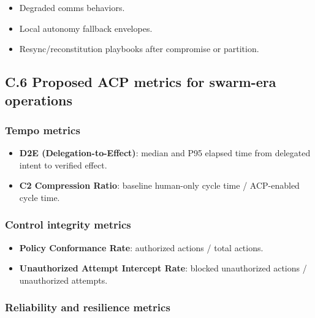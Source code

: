 \documentclass[
]{article}
\providecommand{\tightlist}{%
  \setlength{\itemsep}{0pt}\setlength{\parskip}{0pt}}
\begin{document}
\begin{itemize}
\tightlist
\item
  Degraded comms behaviors.
\item
  Local autonomy fallback envelopes.
\item
  Resync/reconstitution playbooks after compromise or partition.
\end{itemize}

\hypertarget{c.6-proposed-acp-metrics-for-swarm-era-operations}{%
\subsection{C.6 Proposed ACP metrics for swarm-era
operations}\label{c.6-proposed-acp-metrics-for-swarm-era-operations}}

\hypertarget{tempo-metrics}{%
\subsubsection{Tempo metrics}\label{tempo-metrics}}

\begin{itemize}
\tightlist
\item
  \textbf{D2E (Delegation-to-Effect)}: median and P95 elapsed time from
  delegated intent to verified effect.
\item
  \textbf{C2 Compression Ratio}: baseline human-only cycle time /
  ACP-enabled cycle time.
\end{itemize}

\hypertarget{control-integrity-metrics}{%
\subsubsection{Control integrity
metrics}\label{control-integrity-metrics}}

\begin{itemize}
\tightlist
\item
  \textbf{Policy Conformance Rate}: authorized actions / total actions.
\item
  \textbf{Unauthorized Attempt Intercept Rate}: blocked unauthorized
  actions / unauthorized attempts.
\end{itemize}

\hypertarget{reliability-and-resilience-metrics}{%
\subsubsection{Reliability and resilience
metrics}\label{reliability-and-resilience-metrics}}
\end{document}
